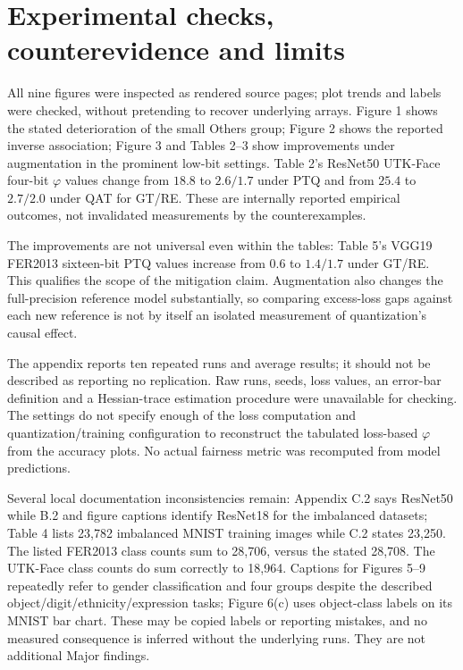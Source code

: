 \documentclass[10pt]{article}
\begin{document}
\section*{Experimental checks, counterevidence and limits}
All nine figures were inspected as rendered source pages; plot trends and labels were checked, without pretending to recover underlying arrays. Figure 1 shows the stated deterioration of the small Others group; Figure 2 shows the reported inverse association; Figure 3 and Tables 2–3 show improvements under augmentation in the prominent low-bit settings. Table 2’s ResNet50 UTK-Face four-bit \(\varphi\) values change from \(18.8\) to \(2.6/1.7\) under PTQ and from \(25.4\) to \(2.7/2.0\) under QAT for GT/RE. These are internally reported empirical outcomes, not invalidated measurements by the counterexamples.\par
The improvements are not universal even within the tables: Table 5’s VGG19 FER2013 sixteen-bit PTQ values increase from \(0.6\) to \(1.4/1.7\) under GT/RE. This qualifies the scope of the mitigation claim. Augmentation also changes the full-precision reference model substantially, so comparing excess-loss gaps against each new reference is not by itself an isolated measurement of quantization’s causal effect.\par
The appendix reports ten repeated runs and average results; it should not be described as reporting no replication. Raw runs, seeds, loss values, an error-bar definition and a Hessian-trace estimation procedure were unavailable for checking. The settings do not specify enough of the loss computation and quantization/training configuration to reconstruct the tabulated loss-based \(\varphi\) from the accuracy plots. No actual fairness metric was recomputed from model predictions.\par
Several local documentation inconsistencies remain: Appendix C.2 says ResNet50 while B.2 and figure captions identify ResNet18 for the imbalanced datasets; Table 4 lists 23,782 imbalanced MNIST training images while C.2 states 23,250. The listed FER2013 class counts sum to 28,706, versus the stated 28,708. The UTK-Face class counts do sum correctly to 18,964. Captions for Figures 5–9 repeatedly refer to gender classification and four groups despite the described object/digit/ethnicity/expression tasks; Figure 6(c) uses object-class labels on its MNIST bar chart. These may be copied labels or reporting mistakes, and no measured consequence is inferred without the underlying runs. They are not additional Major findings.\par
\end{document}
